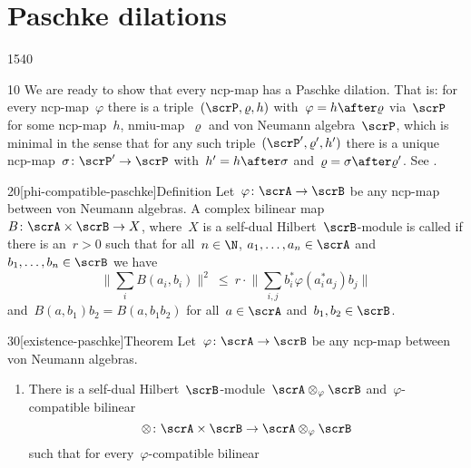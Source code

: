\section{Paschke dilations}
\begin{parsec}{1540}%
\begin{point}{10}%
We are ready to show that every ncp-map has a Paschke dilation.
    That is: for every ncp-map~$\varphi$
        there is a triple~$(\scrP, \varrho, h)$
        with~$\varphi = h \after \varrho$ via~$\scrP$
            for some ncp-map~$h$, nmiu-map~$\varrho$ and von Neumann algebra~$\scrP$,
            which is minimal in the sense
            that for any such triple~$(\scrP', \varrho', h')$
            there is a unique ncp-map~$\sigma\colon \scrP' \to \scrP$
            with~$h' =h \after \sigma$ and~$\varrho=\sigma\after\varrho'$.
    See .
\end{point}
\begin{point}{20}[phi-compatible-paschke]{Definition}%
    Let~$\varphi\colon \scrA \to \scrB$ be any ncp-map between
        von Neumann algebras.
    A complex bilinear map~$B \colon \scrA \times \scrB \to X$,
        where~$X$ is a self-dual Hilbert~$\scrB$-module is
        called 
        if there is an~$r > 0$
        such that for all~$n\in \N$, $a_1, \ldots, a_n \in \scrA$
        and~$b_1, \ldots, b_n \in \scrB$ we have
        \begin{equation}
            \bigl\| \sum_i B(a_i,b_i)\bigr\|^2
             \    \leq \ r \cdot \bigl\| \sum_{i,j} b_i^* \varphi(a_i^*a_j)b_j
                \bigr\| \label{phi-compatible}
        \end{equation}
        and~$B(a,b_1)b_2 = B(a,b_1b_2)$
        for all~$a \in \scrA$ and~$b_1,b_2 \in \scrB$.
\end{point}
\begin{point}{30}[existence-paschke]{Theorem}%
    Let~$\varphi\colon \scrA \to \scrB$ be any ncp-map between
        von Neumann algebras.
\begin{enumerate}
    \item There is a self-dual Hilbert~$\scrB$-module~$\scrA \otimes_\varphi
            \scrB$ and~$\varphi$-compatible bilinear
    \begin{equation*}
        \otimes \colon \scrA \times \scrB \to \scrA \otimes_\varphi \scrB
    \end{equation*}
    such that for every~$\varphi$-compatible bilinear

\end{enumerate}
\end{point}
\end{parsec}
